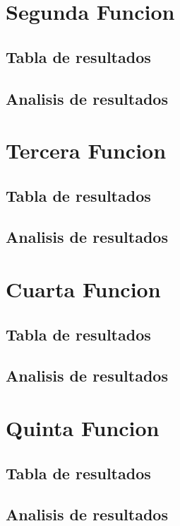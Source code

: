 \documentclass{report}
\begin{document}
        \section{Segunda Funcion}
            \subsection{Tabla de resultados}
            \subsection{Analisis de resultados}

        \section{Tercera Funcion}
            \subsection{Tabla de resultados}
            \subsection{Analisis de resultados}

        \section{Cuarta Funcion}
            \subsection{Tabla de resultados}
            \subsection{Analisis de resultados}

        \section{Quinta Funcion}
            \subsection{Tabla de resultados}
            \subsection{Analisis de resultados} 
\end{document}
